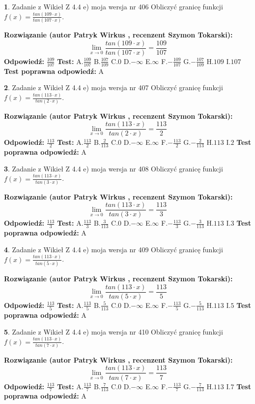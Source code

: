 \documentclass[12pt, a4paper]{article}
\theoremstyle{definition} %
\newtheorem{zad}{}
\newcommand{\zadStart}[1]{\begin{zad}#1\newline}
\newcommand{\zadStop}{\end{zad}}
\newcommand{\rozwStart}[2]{\noindent \textbf{Rozwiązanie (autor #1 , recenzent #2): }\newline}
\newcommand{\rozwStop}{\newline}
\newcommand{\odpStart}{\noindent \textbf{Odpowiedź:}\newline}
\newcommand{\odpStop}{\newline}
\newcommand{\testStart}{\noindent \textbf{Test:}\newline}
\newcommand{\testStop}{\newline}
\newcommand{\kluczStart}{\noindent \textbf{Test poprawna odpowiedź:}\newline}
\newcommand{\kluczStop}{\newline}
\begin{document}
\zadStart{Zadanie z Wikieł Z 4.4 e) moja wersja nr 406}
Obliczyć granicę funkcji $f(x)=\frac{tan(109\cdot x)}{tan(107\cdot x)}$.
\zadStop
\rozwStart{Patryk Wirkus}{Szymon Tokarski}
$$\lim\limits_{x\to 0}\frac{tan(109\cdot x)}{tan(107\cdot x)}=
\frac{109}{107}$$
\rozwStop
\odpStart
$\frac{109}{107}$
\odpStop
\testStart
A.$\frac{109}{107}$
B.$\frac{107}{109}$
C.$0$
D.$-\infty$
E.$\infty$
F.$-\frac{109}{107}$
G.$-\frac{107}{109}$
H.$109$
I.$107$
\testStop
\kluczStart
A
\kluczStop



\zadStart{Zadanie z Wikieł Z 4.4 e) moja wersja nr 407}
Obliczyć granicę funkcji $f(x)=\frac{tan(113\cdot x)}{tan(2\cdot x)}$.
\zadStop
\rozwStart{Patryk Wirkus}{Szymon Tokarski}
$$\lim\limits_{x\to 0}\frac{tan(113\cdot x)}{tan(2\cdot x)}=
\frac{113}{2}$$
\rozwStop
\odpStart
$\frac{113}{2}$
\odpStop
\testStart
A.$\frac{113}{2}$
B.$\frac{2}{113}$
C.$0$
D.$-\infty$
E.$\infty$
F.$-\frac{113}{2}$
G.$-\frac{2}{113}$
H.$113$
I.$2$
\testStop
\kluczStart
A
\kluczStop



\zadStart{Zadanie z Wikieł Z 4.4 e) moja wersja nr 408}
Obliczyć granicę funkcji $f(x)=\frac{tan(113\cdot x)}{tan(3\cdot x)}$.
\zadStop
\rozwStart{Patryk Wirkus}{Szymon Tokarski}
$$\lim\limits_{x\to 0}\frac{tan(113\cdot x)}{tan(3\cdot x)}=
\frac{113}{3}$$
\rozwStop
\odpStart
$\frac{113}{3}$
\odpStop
\testStart
A.$\frac{113}{3}$
B.$\frac{3}{113}$
C.$0$
D.$-\infty$
E.$\infty$
F.$-\frac{113}{3}$
G.$-\frac{3}{113}$
H.$113$
I.$3$
\testStop
\kluczStart
A
\kluczStop



\zadStart{Zadanie z Wikieł Z 4.4 e) moja wersja nr 409}
Obliczyć granicę funkcji $f(x)=\frac{tan(113\cdot x)}{tan(5\cdot x)}$.
\zadStop
\rozwStart{Patryk Wirkus}{Szymon Tokarski}
$$\lim\limits_{x\to 0}\frac{tan(113\cdot x)}{tan(5\cdot x)}=
\frac{113}{5}$$
\rozwStop
\odpStart
$\frac{113}{5}$
\odpStop
\testStart
A.$\frac{113}{5}$
B.$\frac{5}{113}$
C.$0$
D.$-\infty$
E.$\infty$
F.$-\frac{113}{5}$
G.$-\frac{5}{113}$
H.$113$
I.$5$
\testStop
\kluczStart
A
\kluczStop



\zadStart{Zadanie z Wikieł Z 4.4 e) moja wersja nr 410}
Obliczyć granicę funkcji $f(x)=\frac{tan(113\cdot x)}{tan(7\cdot x)}$.
\zadStop
\rozwStart{Patryk Wirkus}{Szymon Tokarski}
$$\lim\limits_{x\to 0}\frac{tan(113\cdot x)}{tan(7\cdot x)}=
\frac{113}{7}$$
\rozwStop
\odpStart
$\frac{113}{7}$
\odpStop
\testStart
A.$\frac{113}{7}$
B.$\frac{7}{113}$
C.$0$
D.$-\infty$
E.$\infty$
F.$-\frac{113}{7}$
G.$-\frac{7}{113}$
H.$113$
I.$7$
\testStop
\kluczStart
A
\kluczStop
\end{document}
